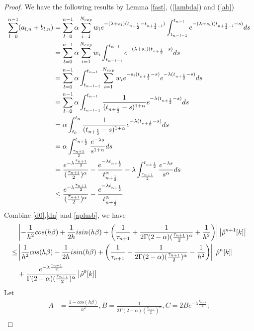 \documentclass[10pt, reqno]{amsart}
\theoremstyle{remark}
\theoremstyle{definition}
\numberwithin{table}{section}
\begin{document}
\begin{proof}
We have the following results by Lemma \ref{fast}, (\ref{lambda}) and (\ref{ab})
\begin{align}
  \sum_{l=0}^{n-1}(a_{l, n}+b_{l, n})  &=\sum_{l=0}^{n-1}\alpha \sum_{i=1}^{N_{exp}}w_ie^{-(\lambda+s_i)(t_{n+\frac{1}{2}}-t_{n+\frac{1}{2}-l})}\int_{t_{n-l-1}}^{t_{n-l}}e^{-(\lambda+s_i)(t_{n+\frac{1}{2}-l}-s)}ds\notag\\
  &=\sum_{l=0}^{n-1}\alpha \sum_{i=1}^{N_{exp}}w_i\int_{t_{n-l-1}}^{t_{n-l}}e^{-(\lambda+s_i)(t_{n+\frac{1}{2}}-s)}ds\notag\\
  &=\sum_{l=0}^{n-1}\alpha\int_{t_{n-l-1}}^{t_{n-l}}\sum_{i=1}^{N_{exp}}w_ie^{-s_i(t_{n+\frac{1}{2}}-s)}e^{-\lambda(t_{n+\frac{1}{2}}-s)}ds\notag\\
  &=\sum_{l=0}^{n-1}\alpha\int_{t_{n-l-1}}^{t_{n-l}}\frac{1}{(t_{n+\frac{1}{2}}-s)^{1+\alpha}}e^{-\lambda(t_{n+\frac{1}{2}}-s)}ds\notag\\
  &=\alpha\int_{t_{0}}^{t_{n}}\frac{1}{(t_{n+\frac{1}{2}}-s)^{1+\alpha}}e^{-\lambda(t_{n+\frac{1}{2}}-s)}ds\notag\\
  &=\alpha\int_{\frac{\tau_{n+1}}{2}}^{t_{n+\frac{1}{2}}}\frac{e^{-\lambda s}}{s^{1+\alpha}}ds\notag\\
  &=\frac{e^{-\lambda \frac{\tau_{n+1}}{2}}}{(\frac{\tau_{n+1}}{2})^\alpha}-\frac{e^{-\lambda t_{n+\frac{1}{2}}}}{t_{n+\frac{1}{2}}^\alpha}-\lambda\int_{\frac{\tau_{n+1}}{2}}^{t_{n+\frac{1}{2}}}\frac{e^{-\lambda s}}{s^{\alpha}}ds\notag\\
  &\leq \frac{e^{-\lambda \frac{\tau_{n+1}}{2}}}{(\frac{\tau_{n+1}}{2})^\alpha}-\frac{e^{-\lambda t_{n+\frac{1}{2}}}}{t_{n+\frac{1}{2}}^\alpha}\label{aplusb}
\end{align}
Combine \ref{d0},\ref{dn} and \ref{aplusb}, we have
\begin{align}
    &\left|-\frac{1}{h^2}cos(h\beta)+\frac{1}{2h}isin(h\beta)+\left(\frac{1}{\tau_{n+1}}+\frac{1}{2\Gamma(2-\alpha)(\frac{\tau_{n+1}}{2})^\alpha}+\frac{1}{h^2}\right) \right|\left|\hat{\rho}^{n+1}[k]\right|\notag \\
    \leq&\left|\frac{1}{h^2}cos(h\beta)-\frac{1}{2h}isin(h\beta)+\left(\frac{1}{\tau_{n+1}}-\frac{1}{2\Gamma(2-\alpha)(\frac{\tau_{n+1}}{2})^\alpha}-\frac{1}{h^2}\right) \right|\left|\hat{\rho}^{n}[k]\right| \notag\\
    &+\frac{e^{-\lambda \frac{\tau_{n+1}}{2}}}{\Gamma(2-\alpha)(\frac{\tau_{n+1}}{2})^\alpha}\left|\hat{\rho}^{0}[k]\right|\label{need1}
\end{align}
Let
\begin{align*}
A &= \frac{1-cos(h\beta)}{h^2},B=\frac{1}{2\Gamma(2-\alpha)(\frac{\tau_{n+1}}{2})^\alpha},C=2Be^{-\lambda\frac{\tau_{n+1}}{2}};\\

\end{align*}
\end{proof}
\end{document}
